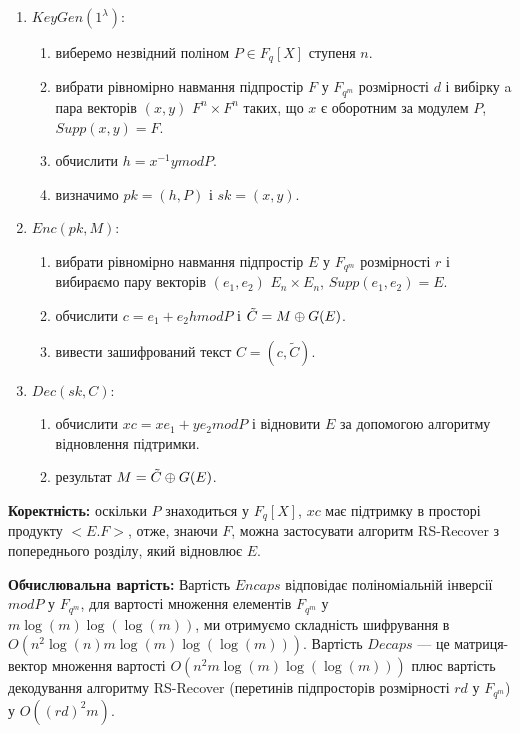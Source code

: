 \begin{enumerate}
    \item $KeyGen(1^{\lambda})$:
    \begin{enumerate}
        \item виберемо незвідний поліном $P \in F_q[X]$ ступеня $n$.
        \item вибрати рівномірно навмання підпростір $F$ у $F_{q^m}$ розмірності $d$ і вибірку a 
        пара векторів $(x, y)$  $F^n \times F^n$ таких, що $x$ є оборотним за модулем $P$, 
        $Supp(x, y) = F$.
        \item обчислити $h = x^{-1}y mod P$.
        \item визначимо $pk = (h,P)$ і $sk = (x,y)$.
    \end{enumerate}
    \item $Enc(pk,M)$:
    \begin{enumerate}
        \item вибрати рівномірно навмання підпростір $E$ у $F_{q^m}$ розмірності $r$ і вибираємо пару векторів $(e_1, e_2)$ $E_n \times E_n$, $Supp(e_1, e_2) = E$.
        \item обчислити $c=e_1+e_2h mod P$ і $\tilde{C}=M \oplus G(E)$.
        \item вивести зашифрований текст $C = (c, \tilde{C})$.
    \end{enumerate}
    \item $Dec(sk,C)$:
    \begin{enumerate}
        \item обчислити $xc = xe_1 + ye_2 mod P$ і відновити $E$ за допомогою алгоритму відновлення підтримки.
        \item результат $M = \tilde{C} \oplus G(E)$.
    \end{enumerate}
\end{enumerate}

\textbf{Коректність:}
оскільки $P$ знаходиться у $F_q[X]$, $xc$ має підтримку в просторі продукту $<E.F>$, отже, знаючи $F$, 
можна застосувати алгоритм RS-Recover з попереднього розділу, який відновлює $E$.

\textbf{Обчислювальна вартість:}
Вартість $Encaps$ відповідає поліноміальній інверсії $mod P$ у $F_{q^m}$, для вартості множення елементів $F_{q^m}$ у $m \log(m) \log(\log(m))$,
 ми отримуємо складність шифрування в $O (n^2 \log(n)m \log (m) \log (\log (m)))$. 
 Вартість $Decaps$ — це матриця-вектор множення вартості $O(n^2 m \log(m) \log(\log(m)))$ 
 плюс вартість декодування алгоритму RS-Recover (перетинів підпросторів розмірності $rd$ у $F_{q^m}$) у $O((rd)^2 m)$.